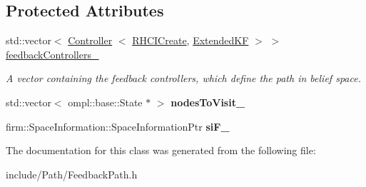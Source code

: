 \subsection*{\-Protected \-Attributes}
\begin{DoxyCompactItemize}
\item 
\hypertarget{class_feedback_path_a4117bfb07f93580234f5d5bc722a2da1}{std\-::vector$<$ \hyperlink{class_controller}{\-Controller}\*
$<$ \hyperlink{class_r_h_c_i_create}{\-R\-H\-C\-I\-Create}, \hyperlink{class_extended_k_f}{\-Extended\-K\-F} $>$ $>$ \hyperlink{class_feedback_path_a4117bfb07f93580234f5d5bc722a2da1}{feedback\-Controllers\-\_\-}}\label{class_feedback_path_a4117bfb07f93580234f5d5bc722a2da1}

\begin{DoxyCompactList}\small\item\em \-A vector containing the feedback controllers, which define the path in belief space. \end{DoxyCompactList}\item 
\hypertarget{class_feedback_path_a6efa9a9ed1e8bf5b784308308feceec7}{std\-::vector$<$ ompl\-::base\-::\-State $\ast$ $>$ {\bfseries nodes\-To\-Visit\-\_\-}}\label{class_feedback_path_a6efa9a9ed1e8bf5b784308308feceec7}

\item 
\hypertarget{class_feedback_path_a46025a3de9b291abfad72ddc37a621f2}{firm\-::\-Space\-Information\-::\-Space\-Information\-Ptr {\bfseries si\-F\-\_\-}}\label{class_feedback_path_a46025a3de9b291abfad72ddc37a621f2}

\end{DoxyCompactItemize}


\-The documentation for this class was generated from the following file\-:\begin{DoxyCompactItemize}
\item 
include/\-Path/\-Feedback\-Path.\-h\end{DoxyCompactItemize}
